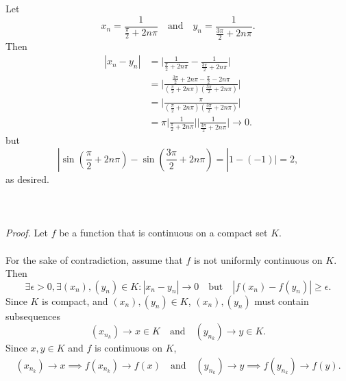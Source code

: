 \documentclass{article}
\begin{document}
            Let
            \begin{equation*}
                x_n=\frac{1}{\frac{\pi}{2}+2n\pi} \quad \text{and} \quad y_n = \frac{1}{\frac{3\pi}{2}+2n\pi}.
            \end{equation*}
            Then
            \begin{align*}
                |x_n-y_n| & = \bigg|\frac{1}{\frac{\pi}{2}+2n\pi} - \frac{1}{\frac{3\pi}{2}+2n\pi}\bigg| \\
                & = \bigg|\frac{\frac{3\pi}{2}+2n\pi - \frac{\pi}{2}-2n\pi}{(\frac{\pi}{2}+2n\pi)(\frac{3\pi}{2}+2n\pi)}\bigg| \\
                &= \bigg|\frac{\pi}{(\frac{\pi}{2}+2n\pi)(\frac{3\pi}{2}+2n\pi)}\bigg| \\
                & = \pi \bigg|\frac{1}{\frac{\pi}{2}+2n\pi}\bigg|\bigg|\frac{1}{\frac{3\pi}{2}+2n\pi}\bigg| \to 0.
            \end{align*}
            but
            \begin{equation*}
                |\sin(\frac{\pi}{2}+2n\pi) - \sin(\frac{3\pi}{2}+2n\pi) = |1-(-1)| = 2,
            \end{equation*}
            as desired.
            \\ \\
            \\ \\
            \textit{Proof.} Let $f$ be a function that is continuous on a compact set $K$.
            \\ \\
            For the sake of contradiction, assume that $f$ is not uniformly continuous on $K$. Then
            \begin{equation*}
                \exists \epsilon>0, \exists (x_n),(y_n) \in K: |x_n-y_n|\to0 \quad \text{but} \quad |f(x_n)-f(y_n)|\geq \epsilon.
            \end{equation*}
            Since $K$ is compact, and $(x_n),(y_n)\in K$, $(x_n),(y_n)$ must contain subsequences
            \begin{equation*}
                (x_{n_k}) \to x \in K \quad \text{and} \quad (y_{n_k}) \to y \in K.
            \end{equation*}
            Since $x,y \in K$ and $f$ is continuous on $K$,
            \begin{align*}
                (x_{n_k}) \to x \implies f(x_{n_k}) \to f(x) \quad \text{and} \quad 
                (y_{n_k}) \to y \implies f(y_{n_k}) \to f(y).
            \end{align*}
\end{document}
